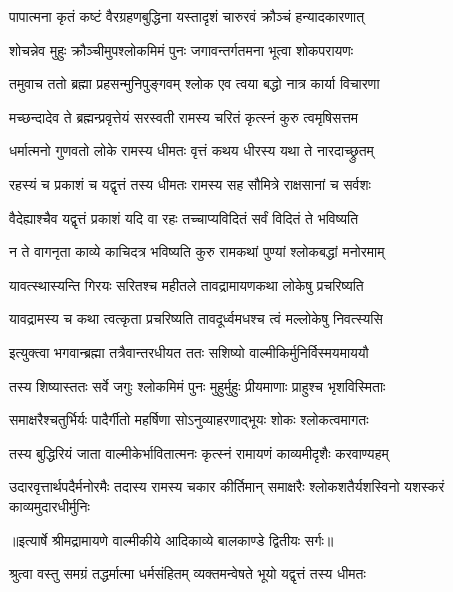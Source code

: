\twolineshloka
{पापात्मना कृतं कष्टं वैरग्रहणबुद्धिना}
{यस्तादृशं चारुरवं क्रौञ्चं हन्यादकारणात्} %

\twolineshloka
{शोचन्नेव मुहुः क्रौञ्चीमुपश्लोकमिमं पुनः}
{जगावन्तर्गतमना भूत्वा शोकपरायणः} %

\twolineshloka
{तमुवाच ततो ब्रह्मा प्रहसन्मुनिपुङ्गवम्}
{श्लोक एव त्वया बद्धो नात्र कार्या विचारणा} %

\twolineshloka
{मच्छन्दादेव ते ब्रह्मन्प्रवृत्तेयं सरस्वती}
{रामस्य चरितं कृत्स्नं कुरु त्वमृषिसत्तम} %

\twolineshloka
{धर्मात्मनो गुणवतो लोके रामस्य धीमतः}
{वृत्तं कथय धीरस्य यथा ते नारदाच्छ्रुतम्} %

\twolineshloka
{रहस्यं च प्रकाशं च यद्वृत्तं तस्य धीमतः}
{रामस्य सह सौमित्रे राक्षसानां च सर्वशः} %

\twolineshloka
{वैदेह्याश्चैव यद्वृत्तं प्रकाशं यदि वा रहः}
{तच्चाप्यविदितं सर्वं विदितं ते भविष्यति} %

\twolineshloka
{न ते वागनृता काव्ये काचिदत्र भविष्यति}
{कुरु रामकथां पुण्यां श्लोकबद्धां मनोरमाम्} %

\twolineshloka
{यावत्स्थास्यन्ति गिरयः सरितश्च महीतले}
{तावद्रामायणकथा लोकेषु प्रचरिष्यति} %

\twolineshloka
{यावद्रामस्य च कथा त्वत्कृता प्रचरिष्यति}
{तावदूर्ध्वमधश्च त्वं मल्लोकेषु निवत्स्यसि} %

\twolineshloka
{इत्युक्त्वा भगवान्ब्रह्मा तत्रैवान्तरधीयत}
{ततः सशिष्यो वाल्मीकिर्मुनिर्विस्मयमाययौ} %

\twolineshloka
{तस्य शिष्यास्ततः सर्वे जगुः श्लोकमिमं पुनः}
{मुहुर्मुहुः प्रीयमाणाः प्राहुश्च भृशविस्मिताः} %

\twolineshloka
{समाक्षरैश्चतुर्भिर्यः पादैर्गीतो महर्षिणा}
{सोऽनुव्याहरणाद्भूयः शोकः श्लोकत्वमागतः} %

\twolineshloka
{तस्य बुद्धिरियं जाता वाल्मीकेर्भावितात्मनः}
{कृत्स्नं रामायणं काव्यमीदृशैः करवाण्यहम्} %

\fourlineindentedshloka
{उदारवृत्तार्थपदैर्मनोरमैः}
{तदास्य रामस्य चकार कीर्तिमान्}
{समाक्षरैः श्लोकशतैर्यशस्विनो}
{यशस्करं काव्यमुदारधीर्मुनिः} %


{॥इत्यार्षे श्रीमद्रामायणे वाल्मीकीये आदिकाव्ये बालकाण्डे द्वितीयः सर्गः॥}


\twolineshloka
{श्रुत्वा वस्तु समग्रं तद्धर्मात्मा धर्मसंहितम्}
{व्यक्तमन्वेषते भूयो यद्वृत्तं तस्य धीमतः} %

